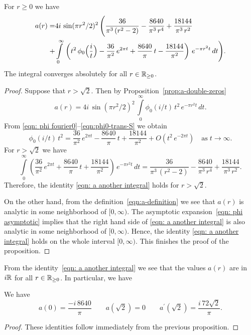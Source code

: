 \begin{proposition}\label{prop: a another integral}
For $r\geq0$ we have
\begin{align}\label{eqn: a another integral}a(r)=&4i\,\sin(\pi r^2/2)^2\,\Bigg(\frac{36}{\pi^3\,(r^2-2)}-\frac{8640}{\pi^3\,r^4}+\frac{18144}{\pi^3\,r^2}\\ +&\int\limits_0^\infty\,\left(t^2\,\phi_0\Big(\frac{i}{t}\Big)-\frac{36}{\pi^2}\,e^{2\pi t}+\frac{8640}{\pi}\,t-\frac{18144}{\pi^2}\right)\,e^{-\pi r^2 t}\,dt \Bigg) .\notag\end{align}
The integral converges absolutely for all $r\in\mathbb{R}_{\geq 0}$.
\end{proposition}
\begin{proof}
Suppose that $r>\sqrt{2}$. Then by Proposition~\ref{prop:a-double-zeros}
$$a(r)=4i\,\sin(\pi r^2/2)^2\,\int\limits_{0}^{\infty}\phi_0(i/t)\,t^2\,e^{-\pi r^2 t}\,dt. $$
From \eqref{eqn: phi fourier0}--\eqref{eqn:phi0-trans-S} we obtain
\begin{equation}\label{eqn: phi asymptotic}
\phi_0(i/t)\,t^2=\frac{36}{\pi^2}\,e^{2 \pi t}-\frac{8640}{\pi}\,t+\frac{18144}{\pi^2}+O(t^2\,e^{-2\pi t})\quad\mbox{as}\;t\to\infty.
\end{equation}
For $r>\sqrt{2}$ we have
\begin{equation}
\int\limits_0^\infty \left(\frac{36}{\pi^2}\,e^{2 \pi t}+\frac{8640}{\pi}\,t+\frac{18144}{\pi^2}\right)\,e^{-\pi r^2 t}\,dt
=\frac{36}{\pi^3\,(r^2-2)}-\frac{8640}{\pi^3\,r^4}+\frac{18144}{\pi^3\,r^2}.\end{equation}
Therefore, the identity \eqref{eqn: a another integral} holds for $r>\sqrt{2}$.

On the other hand, from the definition~\eqref{eqn:a-definition} we see that $a(r)$ is analytic in some neighborhood of $[0,\infty)$. The asymptotic expansion~\eqref{eqn: phi asymptotic} implies that the right hand side of \eqref{eqn: a another integral} is also analytic in some neighborhood of $[0,\infty)$. Hence, the identity \eqref{eqn: a another integral} holds on the whole interval $[0,\infty)$. This finishes the proof of the proposition.
\end{proof}
From the identity~\eqref{eqn: a another integral} we see that the values $a(r)$ are in $i\mathbb{R}$ for all $r\in\mathbb{R}_{\geq0}$. In particular, we have
\begin{proposition}\label{prop: a values}
We have
\begin{equation}
a(0)=\frac{-i\,8640}{\pi}\qquad
a(\sqrt{2})=0\qquad
a^\prime(\sqrt{2})=\frac{i\,72\sqrt{2}}{\pi}.
\end{equation}
\end{proposition}
\begin{proof}
These identities follow immediately from the previous proposition.
\end{proof}

